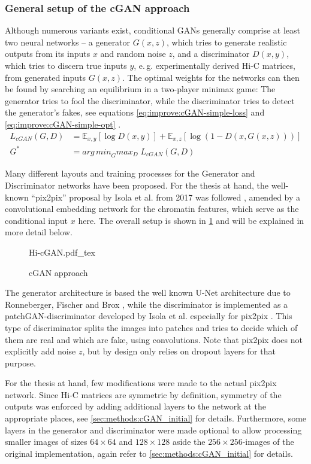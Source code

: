 \subsubsection{General setup of the cGAN approach}
Although numerous variants exist, conditional GANs generally comprise at least two neural networks -- 
a generator $G(x,z)$, which tries to generate realistic outputs from its inputs $x$ and random noise $z$, and a discriminator $D(x,y)$,
which tries to discern true inputs $y$, e.\,g. experimentally derived Hi-C matrices, from generated inputs $G(x,z)$.
The optimal weights for the networks can then be found by searching an equilibrium in a two-player minimax game:
The generator tries to fool the discriminator, while the discriminator tries to detect the generator's fakes, 
see equations \ref{eq:improve:cGAN-simple-loss} and \ref{eq:improve:cGAN-simple-opt} \cite{Isola2017}.
\begin{align}
 L_\mathit{cGAN}(G, D) &= \mathbb{E}_{x,y}[\log D(x,y)] + \mathbb{E}_{x,z}[\log(1-D(x, G(x,z)))] \label{eq:improve:cGAN-simple-loss} \\
 G^* &=  \mathit{arg\,min}_G \mathit{max}_D \; L_\mathit{cGAN}(G, D) \label{eq:improve:cGAN-simple-opt}
\end{align}

Many different layouts and training processes for the Generator and Discriminator networks have been proposed.
For the thesis at hand, the well-known ``pix2pix'' proposal by Isola et al. from 2017 was followed \cite{Isola2017}, 
amended by a convolutional embedding network for the chromatin features, which serve as the conditional input $x$ here.
The overall setup is shown in \cref{fig:improve:cGAN-approach} and will be explained in more detail below.
\begin{figure}[hbp]
 {Hi-cGAN.pdf_tex}
 \caption{cGAN approach} \label{fig:improve:cGAN-approach}
\end{figure}
The generator architecture is based the well known U-Net architecture due to Ronneberger, Fischer and Brox \cite{Ronneberger2015},
while the discriminator is implemented as a patchGAN-discriminator developed by Isola et al. especially for pix2pix \cite{Isola2017}.
This type of discriminator splits the images into patches and tries to decide which of them are real and which are fake, using convolutions.
Note that pix2pix does not explicitly add noise $z$, but by design only relies on dropout layers for that purpose. 

For the thesis at hand, few modifications were made to the actual pix2pix network.
Since Hi-C matrices are symmetric by definition, symmetry of the outputs was enforced
by adding additional layers to the network at the appropriate places, see \cref{sec:methods:cGAN_initial} for details.
Furthermore, some layers in the generator and discriminator were made optional to allow processing smaller images of sizes $64\times64$
and $128\times128$ aside the $256\times256$-images of the original implementation, again refer to \cref{sec:methods:cGAN_initial} for details.

